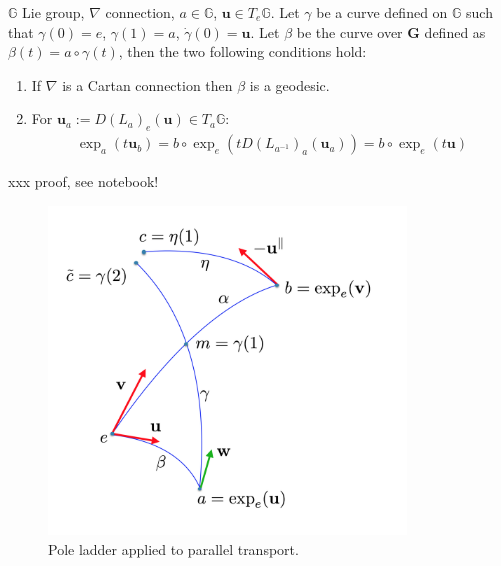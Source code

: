 \begin{lemma}
	$\mathbb{G}$ Lie group, $\nabla$ connection, $a\in\mathbb{G}$, $\mathbf{u}\in T_{e}\mathbb{G}$. Let $\gamma$ be a curve defined on $\mathbb{G}$ such that $\gamma(0) = e$, $\gamma(1) = a$, $\dot{\gamma}(0) =\mathbf{u}$. Let $\beta$ be the curve over $\mathbf{G}$ defined as $\beta(t) = a\circ \gamma(t)$, then the two following conditions hold:
	\begin{enumerate}
		\item If $\nabla$ is a Cartan connection then $\beta$ is a geodesic.
		\item For $\mathbf{u}_{a} := D(L_{a})_{e}(\mathbf{u}) \in T_{a}\mathbb{G}$:
		\begin{align}
		\exp_{a}(t\mathbf{u}_{b}) = b\circ \exp_{e}( t D(L_{a^{-1}})_{a}(\mathbf{u}_{a}) ) = b\circ \exp_{e}(t\mathbf{u})
		\end{align}
	\end{enumerate}
\end{lemma}

\noindent
xxx proof, see notebook!

\begin{figure}[htbp]
	\centering
	\includegraphics[width=9.5cm]{figures/theorem_pict.png}
	\caption{Pole ladder applied to parallel transport.}
	\label{fig:theorem_pict}
\end{figure}

